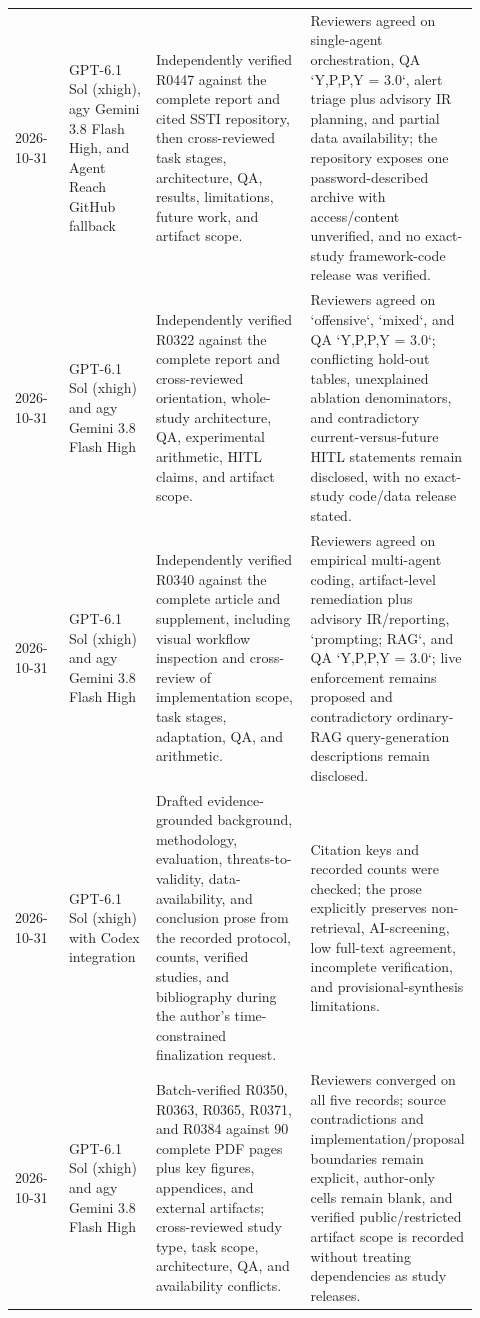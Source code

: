 \begin{longtable}{@{}p{0.13\linewidth}p{0.20\linewidth}p{0.42\linewidth}p{0.17\linewidth}@{}}
2026-10-31 & GPT-6.1 Sol (xhigh), agy Gemini 3.8 Flash High, and Agent Reach GitHub fallback & Independently verified R0447 against the complete report and cited SSTI repository, then cross-reviewed task stages, architecture, QA, results, limitations, future work, and artifact scope. & Reviewers agreed on single-agent orchestration, QA `Y,P,P,Y = 3.0`, alert triage plus advisory IR planning, and partial data availability; the repository exposes one password-described archive with access/content unverified, and no exact-study framework-code release was verified. \\
2026-10-31 & GPT-6.1 Sol (xhigh) and agy Gemini 3.8 Flash High & Independently verified R0322 against the complete report and cross-reviewed orientation, whole-study architecture, QA, experimental arithmetic, HITL claims, and artifact scope. & Reviewers agreed on `offensive`, `mixed`, and QA `Y,P,P,Y = 3.0`; conflicting hold-out tables, unexplained ablation denominators, and contradictory current-versus-future HITL statements remain disclosed, with no exact-study code/data release stated. \\
2026-10-31 & GPT-6.1 Sol (xhigh) and agy Gemini 3.8 Flash High & Independently verified R0340 against the complete article and supplement, including visual workflow inspection and cross-review of implementation scope, task stages, adaptation, QA, and arithmetic. & Reviewers agreed on empirical multi-agent coding, artifact-level remediation plus advisory IR/reporting, `prompting; RAG`, and QA `Y,P,P,Y = 3.0`; live enforcement remains proposed and contradictory ordinary-RAG query-generation descriptions remain disclosed. \\
2026-10-31 & GPT-6.1 Sol (xhigh) with Codex integration & Drafted evidence-grounded background, methodology, evaluation, threats-to-validity, data-availability, and conclusion prose from the recorded protocol, counts, verified studies, and bibliography during the author's time-constrained finalization request. & Citation keys and recorded counts were checked; the prose explicitly preserves non-retrieval, AI-screening, low full-text agreement, incomplete verification, and provisional-synthesis limitations. \\
2026-10-31 & GPT-6.1 Sol (xhigh) and agy Gemini 3.8 Flash High & Batch-verified R0350, R0363, R0365, R0371, and R0384 against 90 complete PDF pages plus key figures, appendices, and external artifacts; cross-reviewed study type, task scope, architecture, QA, and availability conflicts. & Reviewers converged on all five records; source contradictions and implementation/proposal boundaries remain explicit, author-only cells remain blank, and verified public/restricted artifact scope is recorded without treating dependencies as study releases. \\

\end{longtable}
